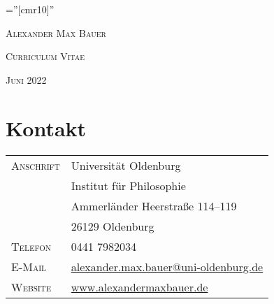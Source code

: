 \documentclass[a4paper,10pt]{article}
\begin{document}
\pagestyle{empty}
\font\fb=''[cmr10]''

\par{\centering
   {\Huge\textsc{Alexander Max Bauer}
   }\bigskip\par}

\par{\centering
   {\Large\textsc{Curriculum Vitae}
   }\bigskip\par}

\par{\centering
   {\Large\textsc{Juni 2022}
   }\bigskip\par}


\section{Kontakt}
\begin{longtable}{p{}p{}}
   \textsc{Anschrift}   & Universität Oldenburg\\
                        & Institut für Philosophie\\
                        & Ammerländer Heerstraße 114--119\\
                        & 26129 Oldenburg\\
   \textsc{Telefon}     & 0441 7982034\\
   \textsc{E-Mail}      & \href{mailto:alexander.max.bauer@uni-oldenburg.de}{alexander.max.bauer@uni-oldenburg.de}\\
   \textsc{Website}     & \href{https://www.alexandermaxbauer.com/}{www.alexandermaxbauer.de}
\end{longtable}


\end{document}
